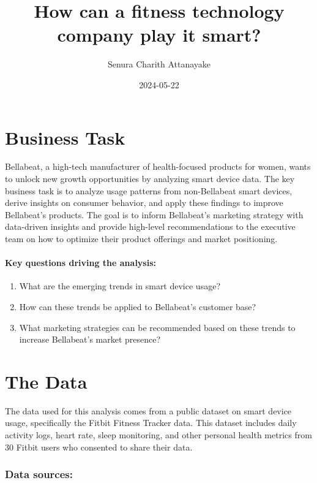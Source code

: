 \documentclass[
]{article}
\title{How can a fitness technology company play it smart?}
\author{Senura Charith Attanayake}
\date{2024-05-22}
\providecommand{\tightlist}{%
  \setlength{\itemsep}{0pt}\setlength{\parskip}{0pt}}
\begin{document}
\maketitle

\hypertarget{business-task}{%
\section{Business Task}\label{business-task}}

Bellabeat, a high-tech manufacturer of health-focused products for
women, wants to unlock new growth opportunities by analyzing smart
device data. The key business task is to analyze usage patterns from
non-Bellabeat smart devices, derive insights on consumer behavior, and
apply these findings to improve Bellabeat's products. The goal is to
inform Bellabeat's marketing strategy with data-driven insights and
provide high-level recommendations to the executive team on how to
optimize their product offerings and market positioning.

\hypertarget{key-questions-driving-the-analysis}{%
\paragraph{Key questions driving the
analysis:}\label{key-questions-driving-the-analysis}}

\begin{enumerate}
\def\labelenumi{\arabic{enumi})}
\tightlist
\item
  What are the emerging trends in smart device usage?
\item
  How can these trends be applied to Bellabeat's customer base?
\item
  What marketing strategies can be recommended based on these trends to
  increase Bellabeat's market presence?
\end{enumerate}

\hypertarget{the-data}{%
\section{The Data}\label{the-data}}

The data used for this analysis comes from a public dataset on smart
device usage, specifically the Fitbit Fitness Tracker data. This dataset
includes daily activity logs, heart rate, sleep monitoring, and other
personal health metrics from 30 Fitbit users who consented to share
their data.

\hypertarget{data-sources}{%
\subsubsection{Data sources:}\label{data-sources}}
\end{document}
